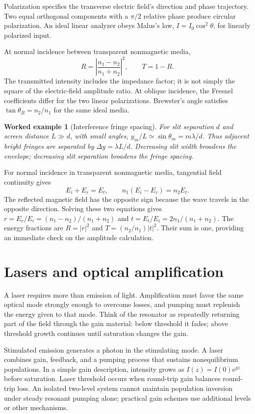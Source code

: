 \documentclass[11pt,oneside]{book}
\newcommand{\ee}{\mathrm{e}}
\theoremstyle{reviewstyle}
\newtheorem{example}{Worked example}[chapter]
\begin{document}
Polarization specifies the transverse electric field's direction and phase trajectory. Two equal orthogonal components with a $\pi/2$ relative phase produce circular polarization. An ideal linear analyzer obeys Malus's law, $I=I_0\cos^2\theta$, for linearly polarized input.

At normal incidence between transparent nonmagnetic media,
\begin{equation}R=\left|\frac{n_1-n_2}{n_1+n_2}\right|^2,\qquad T=1-R.\end{equation}
The transmitted intensity includes the impedance factor; it is not simply the square of the electric-field amplitude ratio. At oblique incidence, the Fresnel coefficients differ for the two linear polarizations. Brewster's angle satisfies $\tan\theta_B=n_2/n_1$ for the same ideal media.
\begin{example}[Interference fringe spacing]
For slit separation $d$ and screen distance $L\gg d$, with small angles, $y_m/L\simeq\sin\theta_m=m\lambda/d$. Thus adjacent bright fringes are separated by $\Delta y=\lambda L/d$. Decreasing slit width broadens the envelope; decreasing slit separation broadens the fringe spacing.
\end{example}

For normal incidence in transparent nonmagnetic media, tangential field continuity gives
\begin{equation}
E_i+E_r=E_t,\qquad n_1(E_i-E_r)=n_2E_t.
\end{equation}
The reflected magnetic field has the opposite sign because the wave travels in the opposite direction. Solving these two equations gives $r=E_r/E_i=(n_1-n_2)/(n_1+n_2)$ and $t=E_t/E_i=2n_1/(n_1+n_2)$. The energy fractions are $R=|r|^2$ and $T=(n_2/n_1)|t|^2$. Their sum is one, providing an immediate check on the amplitude calculation.

\section{Lasers and optical amplification}
A laser requires more than emission of light. Amplification must favor the same optical mode strongly enough to overcome losses, and pumping must replenish the energy given to that mode. Think of the resonator as repeatedly returning part of the field through the gain material: below threshold it fades; above threshold growth continues until saturation changes the gain.

Stimulated emission generates a photon in the stimulating mode. A laser combines gain, feedback, and a pumping process that sustains nonequilibrium populations. In a simple gain description, intensity grows as $I(z)=I(0)\ee^{gz}$ before saturation. Laser threshold occurs when round-trip gain balances round-trip loss. An isolated two-level system cannot maintain population inversion under steady resonant pumping alone; practical gain schemes use additional levels or other mechanisms.
\end{document}
